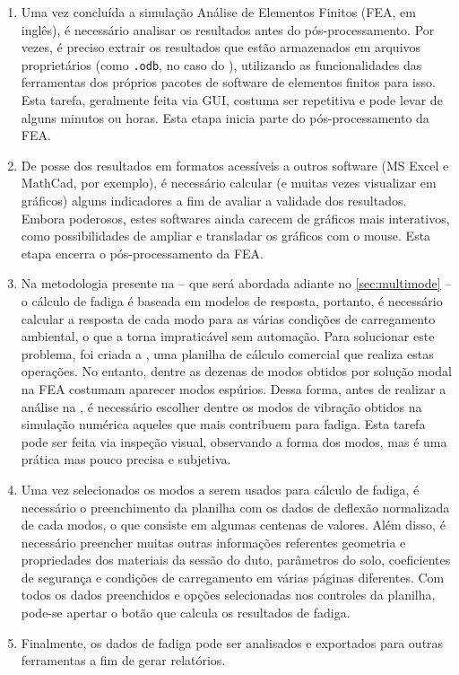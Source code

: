 \begin{enumerate}[label=(\arabic*)]
    \item Uma vez concluída a simulação Análise de Elementos Finitos (FEA, em inglês), é necessário analisar os resultados antes do pós-processamento. Por vezes, é preciso extrair os resultados que estão armazenados em arquivos proprietários (como \texttt{.odb}, no caso do \abaqus), utilizando as funcionalidades das ferramentas dos próprios pacotes de software de elementos finitos para isso. Esta tarefa, geralmente feita via GUI, costuma ser repetitiva e pode levar de alguns minutos ou horas. Esta etapa inicia parte do pós-processamento da FEA.
    \item De posse dos resultados em formatos acessíveis a outros software (MS Excel e MathCad, por exemplo), é necessário calcular (e muitas vezes visualizar em gráficos) alguns indicadores a fim de avaliar a validade dos resultados. Embora poderosos, estes softwares ainda carecem de gráficos mais interativos, como possibilidades de ampliar e transladar os gráficos com o mouse. Esta etapa encerra o pós-processamento da FEA.
    \item Na metodologia presente na  -- que será abordada adiante no \autoref{sec:multimode} -- o cálculo de fadiga é baseada em modelos de resposta, portanto, é necessário calcular a resposta de cada modo para as várias condições de carregamento ambiental, o que a torna impraticável sem automação. Para solucionar este problema, foi criada a \fatfree, uma planilha de cálculo comercial que realiza estas operações. No entanto, dentre as dezenas de modos obtidos por solução modal na FEA costumam aparecer modos espúrios. Dessa forma, antes de realizar a análise na \fatfree, é necessário escolher dentre os modos de vibração obtidos na simulação numérica aqueles que mais contribuem para fadiga. Esta tarefa pode ser feita via inspeção visual, observando a forma dos modos, mas é uma prática mas pouco precisa e subjetiva.
    \item Uma vez selecionados os modos a serem usados para cálculo de fadiga, é necessário o preenchimento da planilha com os dados de deflexão normalizada de cada modos, o que consiste em algumas centenas de valores. Além disso, é necessário preencher muitas outras informações referentes geometria e propriedades dos materiais da sessão do duto, parâmetros do solo, coeficientes de segurança e condições de carregamento em várias páginas diferentes. Com todos os dados preenchidos e opções selecionadas nos controles da planilha, pode-se apertar o botão que calcula os resultados de fadiga.
    \item Finalmente, os dados de fadiga pode ser analisados e exportados para outras ferramentas a fim de gerar relatórios.
\end{enumerate}